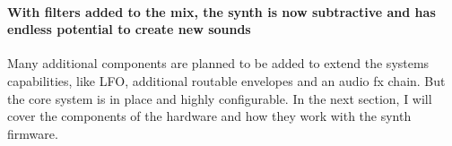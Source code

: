 \documentclass[acmlarge,screen]{acmart}
\begin{document}
	\paragraph{With filters added to the mix, the synth is now subtractive and has endless potential to create new sounds} Many additional components are planned to be added to extend the systems capabilities, like LFO, additional routable envelopes and an audio fx chain. But the core system is in place and highly configurable. In the next section, I will cover the components of the hardware and how they work with the synth firmware.
%	
%	
%
\end{document}
